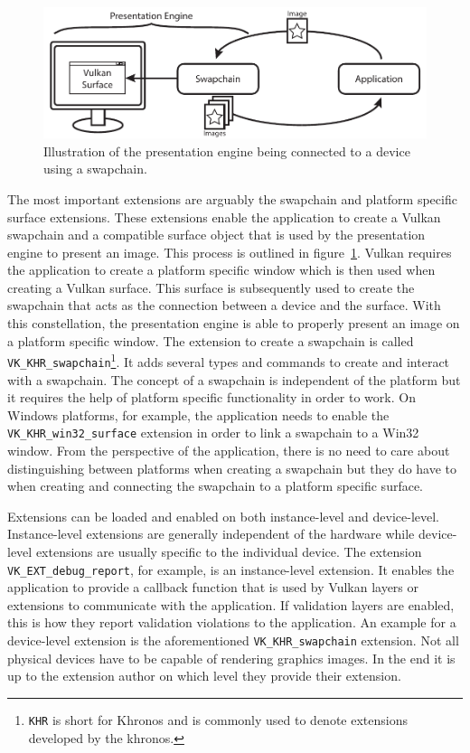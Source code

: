     \begin{figure}
      \centering
      \includegraphics[width=\textwidth]{Main/Images/PresentationEngine}
      \caption{Illustration of the presentation engine being connected to a device using a swapchain.}
      \label{fig:PresentationEngine}
    \end{figure}

    The most important extensions are arguably the swapchain and platform specific surface extensions.
    These extensions enable the \gls{application} to create a Vulkan swapchain and a compatible surface object that is used by the presentation engine to present an image.
    This process is outlined in figure~\ref{fig:PresentationEngine}.
    Vulkan requires the \gls{application} to create a platform specific window which is then used when creating a Vulkan surface.
    This surface is subsequently used to create the swapchain that acts as the connection between a device and the surface.
    With this constellation, the presentation engine is able to properly present an image on a platform specific window.
    The extension to create a swapchain is called
    \lstinline{VK_KHR_swapchain}\footnote{\lstinline{KHR} is short for Khronos and is commonly used to denote extensions developed by the \gls{khronos}.}.
    It adds several types and commands to create and interact with a swapchain.
    The concept of a swapchain is independent of the platform but it requires the help of platform specific functionality in order to work.
    On Windows platforms, for example, the \gls{application} needs to enable the \lstinline{VK_KHR_win32_surface} extension in order to link a swapchain to a Win32 window.
    From the perspective of the \gls{application}, there is no need to care about distinguishing between platforms when creating a swapchain but they do have to when creating and connecting the swapchain to a platform specific surface.

    Extensions can be loaded and enabled on both instance-level and device-level.
    Instance-level extensions are generally independent of the hardware while device-level extensions are usually specific to the individual device.
    The extension \lstinline{VK_EXT_debug_report}, for example, is an instance-level extension.
    It enables the \gls{application} to provide a callback function that is used by Vulkan layers or extensions to communicate with the \gls{application}.
    If validation layers are enabled, this is how they report validation violations to the \gls{application}.
    An example for a device-level extension is the aforementioned \lstinline{VK_KHR_swapchain} extension.
    Not all physical \glspl{device} have to be capable of rendering graphics images.
    In the end it is up to the extension author on which level they provide their extension.

